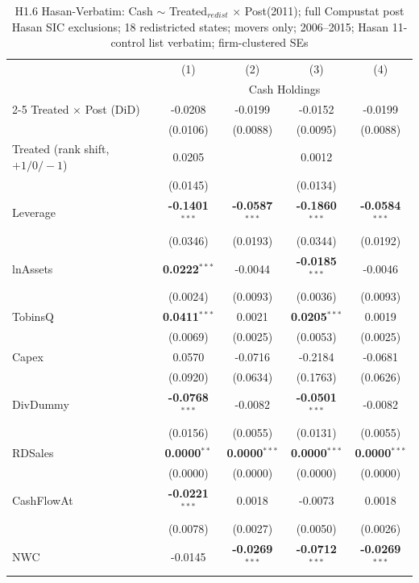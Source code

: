 \documentclass[11pt,a4paper]{article}
\begin{document}
\clearpage
\begin{table}[htbp]
\centering
\caption{H1.6 Hasan-Verbatim: Cash $\sim$ Treated$_{redist}$ $\times$ Post(2011); full Compustat post Hasan SIC exclusions; 18 redistricted states; movers only; 2006--2015; Hasan 11-control list verbatim; firm-clustered SEs}
\label{tab:h1_6_hasan_verbatim}
\scriptsize
\begin{tabular}{lcccc}
\toprule
 & (1) & (2) & (3) & (4) \\
 & \multicolumn{4}{c}{Cash Holdings} \\
\cmidrule(lr){2-5}
\midrule
Treated $\times$ Post (DiD) & -0.0208 & -0.0199 & -0.0152 & -0.0199 \\
 & (0.0106) & (0.0088) & (0.0095) & (0.0088) \\
Treated (rank shift, $+1/0/-1$) & 0.0205 &  & 0.0012 &  \\
 & (0.0145) &  & (0.0134) &  \\
\midrule
Leverage & \textbf{-0.1401}$^{***}$ & \textbf{-0.0587}$^{***}$ & \textbf{-0.1860}$^{***}$ & \textbf{-0.0584}$^{***}$ \\
 & (0.0346) & (0.0193) & (0.0344) & (0.0192) \\
lnAssets & \textbf{0.0222}$^{***}$ & -0.0044 & \textbf{-0.0185}$^{***}$ & -0.0046 \\
 & (0.0024) & (0.0093) & (0.0036) & (0.0093) \\
TobinsQ & \textbf{0.0411}$^{***}$ & 0.0021 & \textbf{0.0205}$^{***}$ & 0.0019 \\
 & (0.0069) & (0.0025) & (0.0053) & (0.0025) \\
Capex & 0.0570 & -0.0716 & -0.2184 & -0.0681 \\
 & (0.0920) & (0.0634) & (0.1763) & (0.0626) \\
DivDummy & \textbf{-0.0768}$^{***}$ & -0.0082 & \textbf{-0.0501}$^{***}$ & -0.0082 \\
 & (0.0156) & (0.0055) & (0.0131) & (0.0055) \\
RDSales & \textbf{0.0000}$^{**}$ & \textbf{0.0000}$^{***}$ & \textbf{0.0000}$^{***}$ & \textbf{0.0000}$^{***}$ \\
 & (0.0000) & (0.0000) & (0.0000) & (0.0000) \\
CashFlowAt & \textbf{-0.0221}$^{***}$ & 0.0018 & -0.0073 & 0.0018 \\
 & (0.0078) & (0.0027) & (0.0050) & (0.0026) \\
NWC & -0.0145 & \textbf{-0.0269}$^{***}$ & \textbf{-0.0712}$^{***}$ & \textbf{-0.0269}$^{***}$ \\

\end{tabular}
\end{table}
\end{document}
